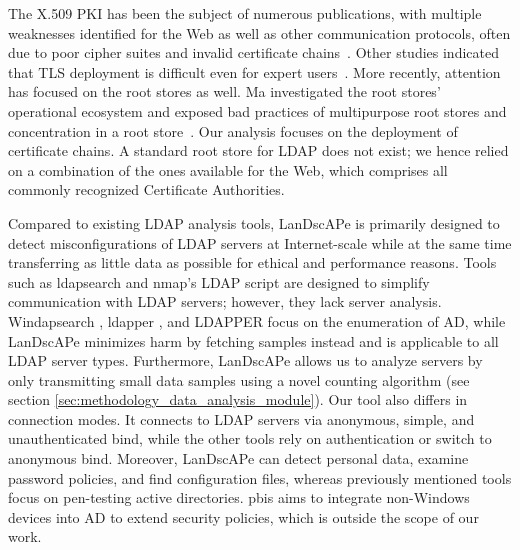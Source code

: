 The X.509 PKI has been the subject of numerous publications, with multiple weaknesses identified for the Web as well as other communication protocols, often due to poor cipher suites and invalid certificate chains~\cite{holz2011,holz2016,Amann2017,Durumeric2013}. Other studies indicated that \acrshort{TLS} deployment is difficult even for expert users~\cite{KrombholzEtAl_HaveNoIdea_2017}. More recently, attention has focused on the root stores as well. Ma \etal investigated the root stores' operational ecosystem and exposed bad practices of multipurpose root stores and concentration in a root store~\cite{maTracingYourRoots2021}. Our analysis focuses on the deployment of certificate chains. A standard root store for \acrshort{LDAP} does not exist; we hence relied on a combination of the ones available for the Web, which comprises all commonly recognized Certificate Authorities.

Compared to existing LDAP analysis tools, LanDscAPe is primarily designed to detect misconfigurations of LDAP servers at Internet-scale while at the same time transferring as little data as possible for ethical and performance reasons. 
Tools such as ldapsearch \cite{LdapsearchCommandLineTool} and nmap’s LDAP script \cite{LdapsearchNSEScript} are designed to simplify communication with LDAP servers; however, they lack server analysis. Windapsearch \cite{flathersRopnopWindapsearch2024}, ldapper \cite{synzackldapper}, and LDAPPER \cite{ldappershellster} focus on the enumeration of \gls{AD}, while LanDscAPe minimizes harm by fetching samples instead and is applicable to all LDAP server types. 
Furthermore, LanDscAPe allows us to analyze servers by only transmitting small data samples using a novel counting algorithm (see section \ref{sec:methodology_data_analysis_module}). Our tool also differs in connection modes. It connects to LDAP servers via anonymous, simple, and unauthenticated bind, while the other tools rely on authentication or switch to anonymous bind. Moreover, LanDscAPe can detect personal data, examine password policies, and find configuration files, whereas previously mentioned tools focus on pen-testing active directories. 
pbis \cite{holsten_josephholstenpbis_2023} aims to integrate non-Windows devices into \gls{AD} to extend security policies, which is outside the scope of our work.

